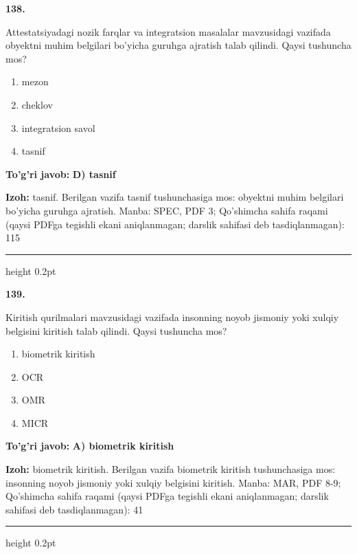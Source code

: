 \documentclass[10pt,a4paper]{article}
\begin{document}
{\bfseries\sffamily\color{ink} 138.}
\par
Attestatsiyadagi nozik farqlar va integratsion masalalar mavzusidagi vazifada obyektni muhim belgilari bo'yicha guruhga ajratish talab qilindi. Qaysi tushuncha mos?
\begin{enumerate}[label=\Alph*),leftmargin=9mm]
\item mezon
\item cheklov
\item integratsion savol
\item tasnif
\end{enumerate}
\begin{tcolorbox}[enhanced,breakable,colback=teal!4,colframe=teal!60!black,boxrule=0.45pt,arc=1.2mm,left=2.7mm,right=2.7mm,top=1.8mm,bottom=1.8mm,before skip=2mm,after skip=2mm]
{\bfseries\sffamily\color{teal}To'g'ri javob:} \textbf{D) tasnif}
\par\smallskip
{\bfseries Izoh:} tasnif. Berilgan vazifa tasnif tushunchasiga mos: obyektni muhim belgilari bo'yicha guruhga ajratish. Manba: SPEC, PDF 3; Qo'shimcha sahifa raqami (qaysi PDFga tegishli ekani aniqlanmagan; darslik sahifasi deb tasdiqlanmagan): 115
\end{tcolorbox}
\vspace{2mm}\hrule height 0.2pt\vspace{3mm}

{\bfseries\sffamily\color{ink} 139.}
\par
Kiritish qurilmalari mavzusidagi vazifada insonning noyob jismoniy yoki xulqiy belgisini kiritish talab qilindi. Qaysi tushuncha mos?
\begin{enumerate}[label=\Alph*),leftmargin=9mm]
\item biometrik kiritish
\item OCR
\item OMR
\item MICR
\end{enumerate}
\begin{tcolorbox}[enhanced,breakable,colback=teal!4,colframe=teal!60!black,boxrule=0.45pt,arc=1.2mm,left=2.7mm,right=2.7mm,top=1.8mm,bottom=1.8mm,before skip=2mm,after skip=2mm]
{\bfseries\sffamily\color{teal}To'g'ri javob:} \textbf{A) biometrik kiritish}
\par\smallskip
{\bfseries Izoh:} biometrik kiritish. Berilgan vazifa biometrik kiritish tushunchasiga mos: insonning noyob jismoniy yoki xulqiy belgisini kiritish. Manba: MAR, PDF 8-9; Qo'shimcha sahifa raqami (qaysi PDFga tegishli ekani aniqlanmagan; darslik sahifasi deb tasdiqlanmagan): 41
\end{tcolorbox}
\vspace{2mm}\hrule height 0.2pt\vspace{3mm}
\end{document}
